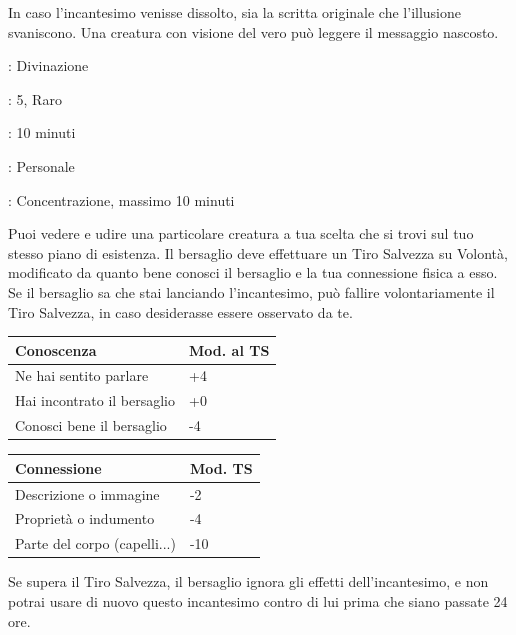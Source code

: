 \begin{multicols}{2}
In caso l'incantesimo venisse dissolto, sia la scritta originale che l'illusione svaniscono. Una creatura con visione del vero può leggere il messaggio nascosto.

\noindent\colorbox{OBSSgold!10}{
\begin{minipage}{0.95\linewidth}
\begin{description}[noitemsep, topsep=0pt, parsep=0pt, partopsep=0pt, leftmargin=0cm, labelwidth=1.3cm]
	\item[\textbf{Lista}]: Divinazione
	\item[\textbf{Livello}]: 5, Raro
	\item[\textbf{Lancio}]: 10 minuti
	\item[\textbf{Gittata}]: Personale
	\item[\textbf{Durata}]: Concentrazione, massimo 10 minuti
\end{description}
\end{minipage}}\smallskip

Puoi vedere e udire una particolare creatura a tua scelta che si trovi sul tuo stesso piano di esistenza. Il bersaglio deve effettuare un Tiro Salvezza su Volontà, modificato da quanto bene conosci il bersaglio e la tua connessione fisica a esso. Se il bersaglio sa che stai lanciando l'incantesimo, può fallire volontariamente il Tiro Salvezza, in caso desiderasse essere osservato da
te.

\medskip

\noindent\begin{tabular}{ll}
	\toprule
	\textbf{Conoscenza} & \textbf{Mod. al TS}\\
	\toprule
	Ne hai sentito parlare &+4\\
	Hai incontrato il bersaglio &+0\\
	Conosci bene il bersaglio &-4
\end{tabular}

\noindent\begin{tabular}{ll}
	\toprule
	\textbf{Connessione} & \textbf{Mod. TS}\\
	\toprule
	Descrizione o immagine &-2\\
	Proprietà o indumento & -4\\
	Parte del corpo (capelli...)&-10
\end{tabular}

\medskip

Se supera il Tiro Salvezza, il bersaglio ignora gli effetti dell'incantesimo, e non potrai usare di nuovo questo incantesimo contro di lui prima che siano passate 24 ore.


\end{multicols}
